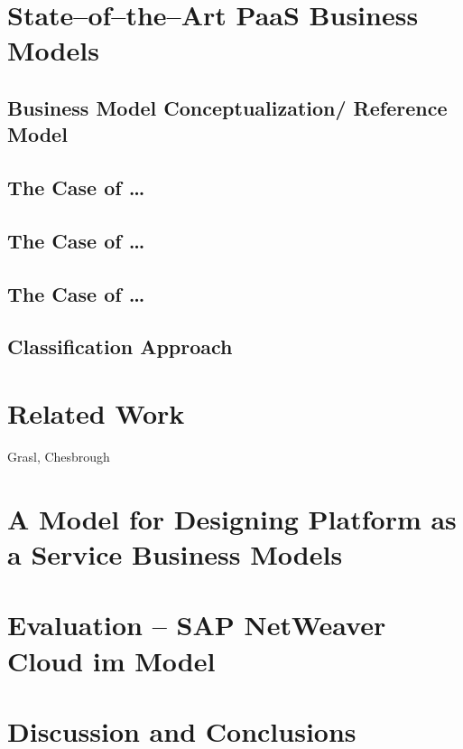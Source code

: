 	\citep{Johnson2008}

\chapter{State--of--the--Art PaaS Business Models}

	\section{Business Model Conceptualization/ Reference Model}
	
	\section{The Case of \ldots}
	\section{The Case of \ldots}
	\section{The Case of \ldots}
	
	\section{Classification Approach}

\chapter{Related Work}
Grasl, Chesbrough


\chapter{A Model for Designing Platform as a Service Business Models}

\chapter{Evaluation -- SAP NetWeaver Cloud im Model}

\chapter{Discussion and Conclusions}



